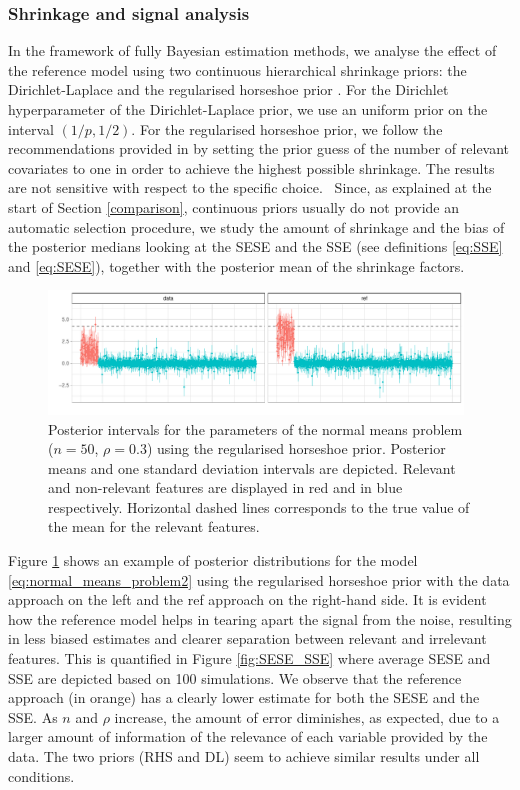\documentclass[american,]{article}
\theoremstyle{definition}
\begin{document}
\hypertarget{shrinkage-signal}{%
\subsubsection{Shrinkage and signal analysis}\label{shrinkage-signal}}
In the framework of fully Bayesian estimation methods, we analyse the
effect of the reference model using two continuous hierarchical
shrinkage priors: the Dirichlet-Laplace
\citep{paper:dirichlet_laplace} and the regularised horseshoe prior
\citep{paper:rhs}.
%
For the Dirichlet hyperparameter of the Dirichlet-Laplace prior, we
use an uniform prior on the interval $(1/p,1/2)$. For the regularised
horseshoe prior, we follow the recommendations provided in
\cite{paper:rhs} by setting the prior guess of the number of relevant
covariates to one in order to achieve the highest possible
shrinkage. The results are not sensitive with respect to the specific
choice.  \ Since, as explained at the start of Section
\ref{comparison}, continuous priors usually do not provide an
automatic selection procedure, we study the amount of shrinkage and
the bias of the posterior medians looking at the SESE and the SSE (see
definitions \eqref{eq:SSE} and \eqref{eq:SESE}), together with the
posterior mean of the shrinkage factors.

\begin{figure}[tp]
  \centering
  \includegraphics[width=0.98\textwidth]{graphics/post_int.pdf}
  \caption{Posterior intervals for the parameters of the normal means
    problem ($n=50$, $\rho=0.3$) using the regularised horseshoe
    prior. Posterior means and one standard deviation intervals are
    depicted. Relevant and non-relevant features are displayed in red
    and in blue respectively. Horizontal dashed lines corresponds to
    the true value of the mean for the relevant features.\\}
  \label{fig:posterior_intervals}
\end{figure}

Figure \ref{fig:posterior_intervals} shows an example of posterior
distributions for the model \eqref{eq:normal_means_problem2} using the
regularised horseshoe prior with the data approach on the left and the
ref approach on the right-hand side. It is evident how the reference
model helps in tearing apart the signal from the noise, resulting in
less biased estimates and clearer separation between relevant and
irrelevant features. This is quantified in Figure \ref{fig:SESE_SSE}
where average SESE and SSE are depicted based on 100 simulations. We
observe that the reference approach (in orange) has a clearly lower
estimate for both the SESE and the SSE. As $n$ and $\rho$ increase,
the amount of error diminishes, as expected, due to a larger amount of
information of the relevance of each variable provided by the
data. The two priors (RHS and DL) seem to achieve similar results
under all conditions.
\end{document}
